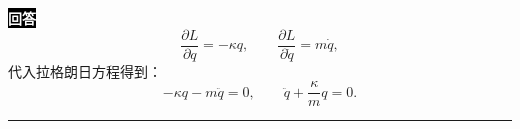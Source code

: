 \documentclass[11pt,a4paper]{ctexart}
\newenvironment{answer}
  {\par\smallskip\noindent
   \begingroup
   \setlength{\fboxsep}{4pt}%
   \colorbox{black}{\textcolor{white}{\bfseries 回答}}%
   \endgroup
   \quad\ignorespaces}
  {\par\smallskip\noindent\rule{\linewidth}{0.4pt}\medskip}
\begin{document}
\begin{answer}
  \begin{equation}
    \frac{\partial L }{\partial q } = -\kappa q,\qquad
    \frac{\partial L }{\partial \dot{q} } = m\dot{q},
  \end{equation}
  代入拉格朗日方程得到：
  \begin{equation}
    -\kappa q - m\ddot{q} = 0,\qquad
    \ddot{q} + \frac{\kappa }{m } q = 0. 
  \end{equation}
\end{answer}
\end{document}
